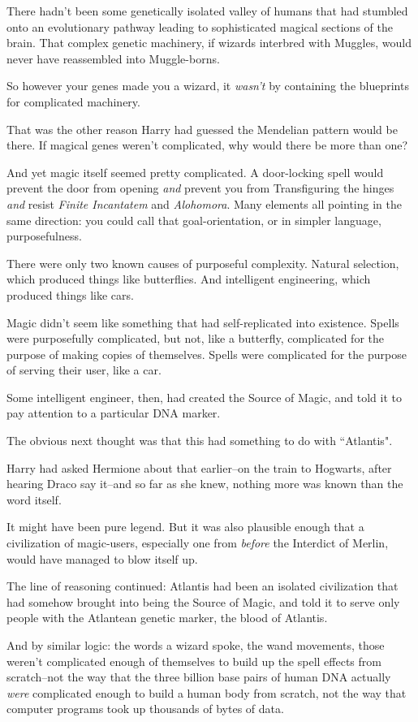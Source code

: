There hadn't been some genetically isolated valley of humans that had stumbled onto an evolutionary pathway leading to sophisticated magical sections of the brain. That complex genetic machinery, if wizards interbred with Muggles, would never have reassembled into Muggle-borns.

So however your genes made you a wizard, it \emph{wasn't} by containing the blueprints for complicated machinery.

That was the other reason Harry had guessed the Mendelian pattern would be there. If magical genes weren't complicated, why would there be more than one?

And yet magic itself seemed pretty complicated. A door-locking spell would prevent the door from opening \emph{and} prevent you from Transfiguring the hinges \emph{and} resist \emph{Finite Incantatem} and \emph{Alohomora}. Many elements all pointing in the same direction: you could call that goal-orientation, or in simpler language, purposefulness.

There were only two known causes of purposeful complexity. Natural selection, which produced things like butterflies. And intelligent engineering, which produced things like cars.

Magic didn't seem like something that had self-replicated into existence. Spells were purposefully complicated, but not, like a butterfly, complicated for the purpose of making copies of themselves. Spells were complicated for the purpose of serving their user, like a car.

Some intelligent engineer, then, had created the Source of Magic, and told it to pay attention to a particular DNA marker.

The obvious next thought was that this had something to do with ``Atlantis".

Harry had asked Hermione about that earlier\---on the train to Hogwarts, after hearing Draco say it\---and so far as she knew, nothing more was known than the word itself.

It might have been pure legend. But it was also plausible enough that a civilization of magic-users, especially one from \emph{before} the Interdict of Merlin, would have managed to blow itself up.

The line of reasoning continued: Atlantis had been an isolated civilization that had somehow brought into being the Source of Magic, and told it to serve only people with the Atlantean genetic marker, the blood of Atlantis.

And by similar logic: the words a wizard spoke, the wand movements, those weren't complicated enough of themselves to build up the spell effects from scratch\---not the way that the three billion base pairs of human DNA actually \emph{were} complicated enough to build a human body from scratch, not the way that computer programs took up thousands of bytes of data.

